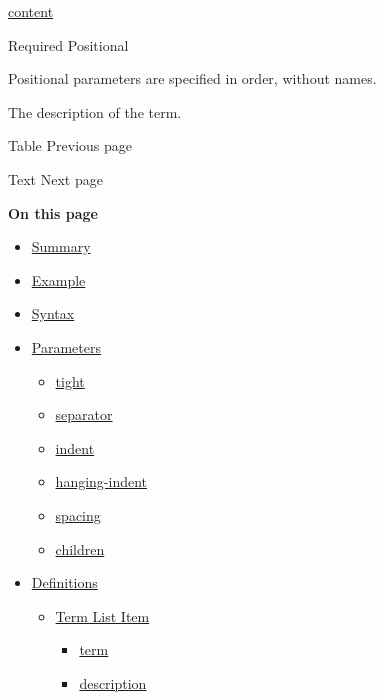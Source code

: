 \href{/docs/reference/foundations/content/}{content}

{Required} {{ Positional }}

\label{definitions-item-description-positional-tooltip}
Positional parameters are specified in order, without names.

The description of the term.

\href{/docs/reference/model/table/}{\pandocbounded{}}

{ Table } { Previous page }

\href{/docs/reference/text/}{\pandocbounded{}}

{ Text } { Next page }

\textbf{On this page}

\begin{itemize}
\tightlist
\item
  \hyperref[summary]{Summary}
\item
  \hyperref[example]{Example}
\item
  \hyperref[syntax]{Syntax}
\item
  \hyperref[parameters]{Parameters}

  \begin{itemize}
  \tightlist
  \item
    \hyperref[parameters-tight]{tight}
  \item
    \hyperref[parameters-separator]{separator}
  \item
    \hyperref[parameters-indent]{indent}
  \item
    \hyperref[parameters-hanging-indent]{hanging-indent}
  \item
    \hyperref[parameters-spacing]{spacing}
  \item
    \hyperref[parameters-children]{children}
  \end{itemize}
\item
  \hyperref[definitions]{Definitions}

  \begin{itemize}
  \tightlist
  \item
    \hyperref[definitions-item]{Term List Item}

    \begin{itemize}
    \tightlist
    \item
      \hyperref[definitions-item-term]{term}
    \item
      \hyperref[definitions-item-description]{description}
    \end{itemize}
  \end{itemize}
\end{itemize}

